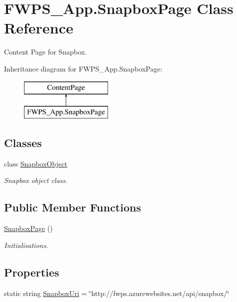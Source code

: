 \hypertarget{class_f_w_p_s___app_1_1_snapbox_page}{}\section{F\+W\+P\+S\+\_\+\+App.\+Snapbox\+Page Class Reference}
\label{class_f_w_p_s___app_1_1_snapbox_page}


Content Page for Snapbox.  


Inheritance diagram for F\+W\+P\+S\+\_\+\+App.\+Snapbox\+Page\+:\begin{figure}[H]
\begin{center}
\leavevmode
\includegraphics[height=2.000000cm]{class_f_w_p_s___app_1_1_snapbox_page}
\end{center}
\end{figure}
\subsection*{Classes}
\begin{DoxyCompactItemize}
\item 
class \mbox{\hyperlink{class_f_w_p_s___app_1_1_snapbox_page_1_1_snapbox_object}{Snapbox\+Object}}
\begin{DoxyCompactList}\small\item\em Snapbox object class. \end{DoxyCompactList}\end{DoxyCompactItemize}
\subsection*{Public Member Functions}
\begin{DoxyCompactItemize}
\item 
\mbox{\hyperlink{class_f_w_p_s___app_1_1_snapbox_page_a5d949f63be2c1f05f5c9c97f7847608b}{Snapbox\+Page}} ()
\begin{DoxyCompactList}\small\item\em Initialisations. \end{DoxyCompactList}\end{DoxyCompactItemize}
\subsection*{Properties}
\begin{DoxyCompactItemize}
\item 
static string \mbox{\hyperlink{class_f_w_p_s___app_1_1_snapbox_page_acef322a24ff86a42f3a7af541a9cfbcc}{Snapbox\+Uri}} = \char`\"{}http\+://fwps.\+azurewebsites.\+net/api/snapbox/\char`\"{}
\end{DoxyCompactItemize}

